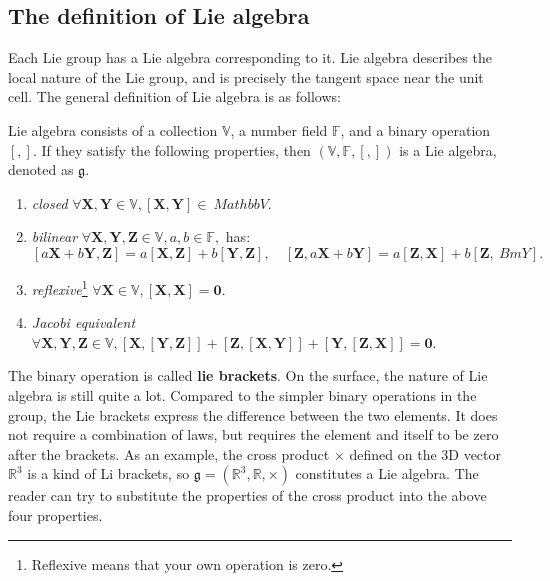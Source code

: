 \subsection{The definition of Lie algebra}

Each Lie group has a Lie algebra corresponding to it. Lie algebra describes the local nature of the Lie group, and is precisely the tangent space near the unit cell. The general definition of Lie algebra is as follows:

Lie algebra consists of a collection $\mathbb{V}$, a number field $\mathbb{F}$, and a binary operation $[,]$. If they satisfy the following properties, then $(\mathbb{V}, \mathbb{F}, [,])$ is a Lie algebra, denoted as $\mathfrak{g}$.

\begin{enumerate}
\item{ \emph{closed} } \quad $\forall \bm{X}, \bm{Y} \in \mathbb{V}, [\bm{X}, \bm{Y}] \in \ Mathbb{V}$.
\item{ \emph{bilinear} } \quad $\forall \bm{X},\bm{Y},\bm{Z} \in \mathbb{V}, a,b \in \mathbb{F }, $ has:
\[
[a\bm{X}+b\bm{Y}, \bm{Z}] = a[\bm{X}, \bm{Z}] + b [ \bm{Y}, \bm{Z} ], \quad [\bm{Z}, a \bm{X}+b\bm{Y}] = a [\bm{Z}, \bm{X} ]+ b [\bm{Z},\ Bm{Y}] .
\]
\item{ \emph{reflexive}}\footnote{ Reflexive means that your own operation is zero. } \quad $\forall \bm{X} \in \mathbb{V}, [\bm{X},\bm{X}] = \bm{0}$.
\item { \emph{Jacobi equivalent} } \quad $\forall \bm{X},\bm{Y},\bm{Z} \in \mathbb{V}, [\bm{X}, [ \bm{Y},\bm{Z}] ] + [\bm{Z}, [\bm{X},\bm{Y}] ] + [\bm{Y}, [\bm{Z}, \bm{X}]] =\bm{0}$.
\end{enumerate}

The binary operation is called \textbf{lie brackets}.
On the surface, the nature of Lie algebra is still quite a lot.
Compared to the simpler binary operations in the group, the Lie brackets express the difference between the two elements.
It does not require a combination of laws, but requires the element and itself to be zero after the brackets.
As an example, the cross product $\times$ defined on the 3D vector $\mathbb{R}^3$ is a kind of Li brackets, so $\mathfrak{g} = (\mathbb{R}^3, \mathbb{R }, \times)$ constitutes a Lie algebra.
The reader can try to substitute the properties of the cross product into the above four properties.


